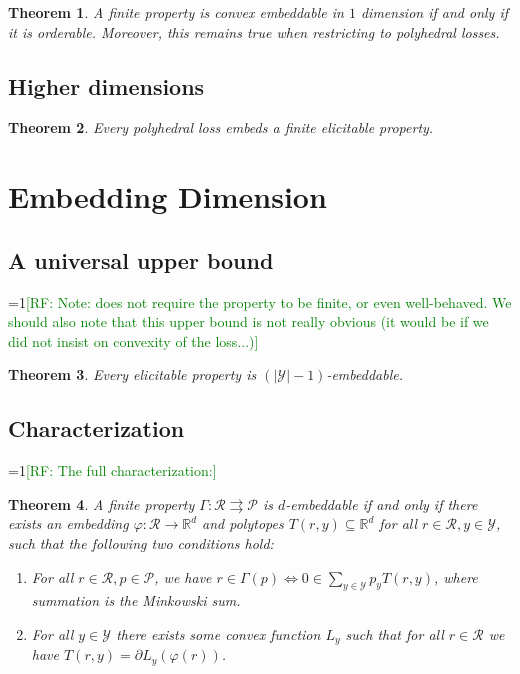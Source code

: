 \documentclass[11pt]{article}
\newcommand{\Comments}{1}
\newcommand{\mynote}[2]{\ifnum\Comments=1\textcolor{#1}{#2}\fi}
\newcommand{\raf}[1]{\mynote{green}{[RF: #1]}}
\newcommand{\reals}{\mathbb{R}}
\renewcommand{\P}{\mathcal{P}}
\newcommand{\R}{\mathcal{R}}
\newcommand{\Y}{\mathcal{Y}}
\newcommand{\toto}{\rightrightarrows}
\newtheorem{theorem}{Theorem}
\begin{document}
\begin{theorem}\label{thm:fplc-orderable}
  A finite property is convex embeddable in $1$ dimension if and only if it is orderable.
  Moreover, this remains true when restricting to polyhedral losses.
\end{theorem}

\subsection{Higher dimensions}

\begin{theorem}
  Every polyhedral loss embeds a finite elicitable property.
\end{theorem}

\section{Embedding Dimension}

\subsection{A universal upper bound}
\raf{Note: does not require the property to be finite, or even well-behaved.  We should also note that this upper bound is not really obvious (it would be if we did not insist on convexity of the loss...)}
\begin{theorem}
  Every elicitable property is $(|\Y|-1)$-embeddable.
\end{theorem}

\subsection{Characterization}

\raf{The full characterization:}
\begin{theorem}
  A finite property $\Gamma:\R\toto\P$ is $d$-embeddable if and only if there exists an embedding $\varphi: \R \to \reals^d$ and polytopes $T(r,y) \subseteq \reals^d$ for all $r\in\R, y\in\Y$, such that the following two conditions hold:
  \begin{enumerate}
  \item For all $r\in\R, p\in\P$, we have $r\in \Gamma(p) \iff 0 \in \sum_{y\in\Y} p_y T(r,y)$, where summation is the Minkowski sum.
  \item For all $y\in\Y$ there exists some convex function $L_y$ such that for all $r\in\R$ we have $T(r,y) = \partial L_y(\varphi(r))$.
  \end{enumerate}
\end{theorem}
\end{document}
